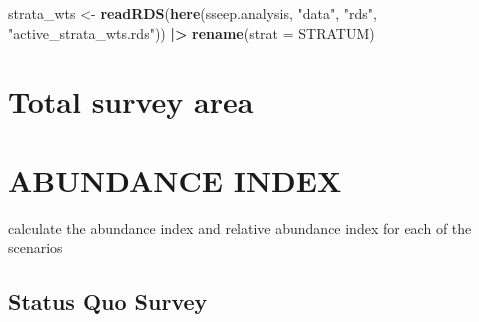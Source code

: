 \documentclass[
]{article}
\newenvironment{Shaded}{\begin{snugshade}}{\end{snugshade}}
\newcommand{\AttributeTok}[1]{\textcolor[rgb]{0.13,0.29,0.53}{#1}}
\newcommand{\FunctionTok}[1]{\textcolor[rgb]{0.13,0.29,0.53}{\textbf{#1}}}
\newcommand{\NormalTok}[1]{#1}
\newcommand{\OtherTok}[1]{\textcolor[rgb]{0.56,0.35,0.01}{#1}}
\newcommand{\SpecialCharTok}[1]{\textcolor[rgb]{0.81,0.36,0.00}{\textbf{#1}}}
\newcommand{\StringTok}[1]{\textcolor[rgb]{0.31,0.60,0.02}{#1}}
\begin{document}
\begin{Shaded}
\begin{Highlighting}[]
\NormalTok{strata\_wts }\OtherTok{\textless{}{-}} \FunctionTok{readRDS}\NormalTok{(}\FunctionTok{here}\NormalTok{(sseep.analysis, }\StringTok{"data"}\NormalTok{, }\StringTok{"rds"}\NormalTok{, }\StringTok{"active\_strata\_wts.rds"}\NormalTok{)) }\SpecialCharTok{|\textgreater{}}
  \FunctionTok{rename}\NormalTok{(}\AttributeTok{strat =}\NormalTok{ STRATUM)}
\end{Highlighting}
\end{Shaded}

\section{Total survey area}\label{total-survey-area}

\begin{Shaded}
\end{Shaded}

\section{ABUNDANCE INDEX}\label{abundance-index}

calculate the abundance index and relative abundance index for each of
the scenarios

\subsection{Status Quo Survey}\label{status-quo-survey}
\end{document}
